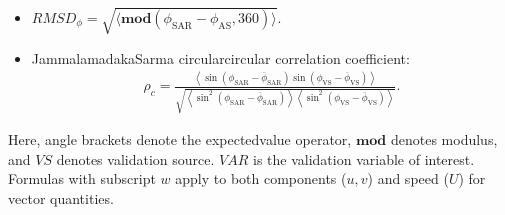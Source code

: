 \documentclass[a4paper,10pt,english]{sphinxmanual}
\begin{document}
\begin{itemize}
\begin{itemize}
\item {} 
\sphinxAtStartPar
\(RMSD_\phi=\sqrt{\langle\mathbf{mod}(\phi_{\mathrm{SAR}}-\phi_{\mathrm{AS}},360)\rangle}\).

\item {} 
\sphinxAtStartPar
Jammalamadaka\textendash{}Sarma circular\sphinxhyphen{}circular correlation coefficient:
\begin{equation*}
\begin{split}\rho_c=
\frac{\left\langle
\sin(\phi_{\mathrm{SAR}}-\overline{\phi}_{\mathrm{SAR}})
\sin(\phi_{\mathrm{VS}}-\overline{\phi}_{\mathrm{VS}})
\right\rangle}
{\sqrt{
\left\langle\sin^2(\phi_{\mathrm{SAR}}-\overline{\phi}_{\mathrm{SAR}})\right\rangle
\left\langle\sin^2(\phi_{\mathrm{VS}}-\overline{\phi}_{\mathrm{VS}})\right\rangle
}} .\end{split}
\end{equation*}
\end{itemize}

\end{itemize}

\sphinxAtStartPar
Here, angle brackets denote the expected\sphinxhyphen{}value operator, \(\mathbf{mod}\)
denotes modulus, and \(VS\) denotes validation source. \(VAR\) is the
validation variable of interest. Formulas with subscript \(w\) apply to
both components (\(u,v\)) and speed (\(U\)) for vector quantities.
\end{document}
